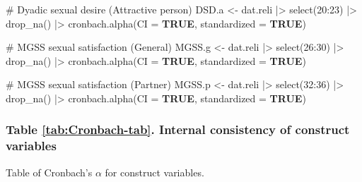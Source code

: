 \documentclass[
  bookmarksnumbered]{article}
\newenvironment{Shaded}{\begin{snugshade}}{\end{snugshade}}
\newcommand{\AttributeTok}[1]{\textcolor[rgb]{0.80,0.80,0.80}{#1}}
\newcommand{\CommentTok}[1]{\textcolor[rgb]{0.50,0.62,0.50}{#1}}
\newcommand{\ConstantTok}[1]{\textcolor[rgb]{0.86,0.64,0.64}{\textbf{#1}}}
\newcommand{\DecValTok}[1]{\textcolor[rgb]{0.86,0.86,0.80}{#1}}
\newcommand{\FunctionTok}[1]{\textcolor[rgb]{0.94,0.94,0.56}{#1}}
\newcommand{\NormalTok}[1]{\textcolor[rgb]{0.80,0.80,0.80}{#1}}
\newcommand{\OtherTok}[1]{\textcolor[rgb]{0.94,0.94,0.56}{#1}}
\newcommand{\SpecialCharTok}[1]{\textcolor[rgb]{0.86,0.64,0.64}{#1}}
\begin{document}
\begin{Shaded}
\begin{Highlighting}[]
\CommentTok{\# Dyadic sexual desire (Attractive person)}
\NormalTok{DSD.a }\OtherTok{\textless{}{-}}\NormalTok{ dat.reli }\SpecialCharTok{|\textgreater{}}
  \FunctionTok{select}\NormalTok{(}\DecValTok{20}\SpecialCharTok{:}\DecValTok{23}\NormalTok{) }\SpecialCharTok{|\textgreater{}} 
  \FunctionTok{drop\_na}\NormalTok{() }\SpecialCharTok{|\textgreater{}} 
  \FunctionTok{cronbach.alpha}\NormalTok{(}\AttributeTok{CI =} \ConstantTok{TRUE}\NormalTok{, }\AttributeTok{standardized =} \ConstantTok{TRUE}\NormalTok{)}

\CommentTok{\# MGSS sexual satisfaction (General)}
\NormalTok{MGSS.g }\OtherTok{\textless{}{-}}\NormalTok{ dat.reli }\SpecialCharTok{|\textgreater{}}
  \FunctionTok{select}\NormalTok{(}\DecValTok{26}\SpecialCharTok{:}\DecValTok{30}\NormalTok{) }\SpecialCharTok{|\textgreater{}} 
  \FunctionTok{drop\_na}\NormalTok{() }\SpecialCharTok{|\textgreater{}} 
  \FunctionTok{cronbach.alpha}\NormalTok{(}\AttributeTok{CI =} \ConstantTok{TRUE}\NormalTok{, }\AttributeTok{standardized =} \ConstantTok{TRUE}\NormalTok{)}

\CommentTok{\# MGSS sexual satisfaction (Partner)}
\NormalTok{MGSS.p }\OtherTok{\textless{}{-}}\NormalTok{ dat.reli }\SpecialCharTok{|\textgreater{}}
  \FunctionTok{select}\NormalTok{(}\DecValTok{32}\SpecialCharTok{:}\DecValTok{36}\NormalTok{) }\SpecialCharTok{|\textgreater{}} 
  \FunctionTok{drop\_na}\NormalTok{() }\SpecialCharTok{|\textgreater{}} 
  \FunctionTok{cronbach.alpha}\NormalTok{(}\AttributeTok{CI =} \ConstantTok{TRUE}\NormalTok{, }\AttributeTok{standardized =} \ConstantTok{TRUE}\NormalTok{)}
\end{Highlighting}
\end{Shaded}

\subsubsection{Table \ref{tab:Cronbach-tab}. Internal consistency of construct variables}\label{table-reftabcronbach-tab.-internal-consistency-of-construct-variables}

Table of Cronbach's \(\alpha\) for construct variables.
\end{document}
